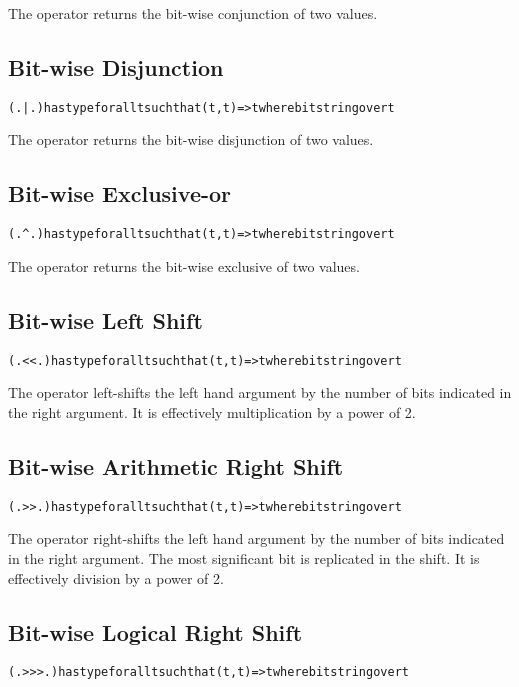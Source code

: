 The  operator returns the bit-wise conjunction of two values.

\subsection{ Bit-wise Disjunction}
\label{bitOr}
\begin{alltt}
(.|.) has type for all t such that (t,t)=>t where bitstring over t
\end{alltt}

The  operator returns the bit-wise disjunction of two values.

\subsection{ Bit-wise Exclusive-or}
\label{bitXor}
\begin{alltt}
(.^.) has type for all t such that (t,t)=>t where bitstring over t
\end{alltt}

The  operator returns the bit-wise exclusive of two values.

\subsection{ Bit-wise Left Shift}
\label{bitLeft}
\begin{alltt}
(.<<.) has type for all t such that (t,t)=>t where bitstring over t
\end{alltt}

The  operator left-shifts the left hand argument by the number of bits indicated in the right argument. It is effectively multiplication by a power of 2.

\subsection{ Bit-wise Arithmetic Right Shift}
\label{bitRight}
\begin{alltt}
(.>>.) has type for all t such that (t,t)=>t where bitstring over t
\end{alltt}

The  operator right-shifts the left hand argument by the number of bits indicated in the right argument. The most significant bit is replicated in the shift. It is effectively division by a power of 2.

\subsection{ Bit-wise Logical Right Shift}
\label{bitRightLogic}
\begin{alltt}
(.>>>.) has type for all t such that (t,t)=>t where bitstring over t
\end{alltt}

